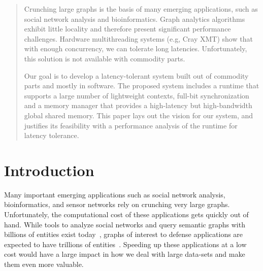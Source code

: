 \documentclass[10pt,nocopyrightspace]{sigplanconf}
\begin{document}
\thispagestyle{empty}
\pagestyle{empty}


\begin{abstract}
   Crunching large graphs is the basis of many emerging applications,
   such as social network analysis and bioinformatics. Graph analytics
   algorithms exhibit little locality and therefore present significant
   performance challenges. Hardware multithreading systems (e.g, Cray
   XMT) show that with enough concurrency, we can tolerate long
   latencies. Unfortunately, this solution is not available with
   commodity parts.
 
   Our goal is to develop a latency-tolerant system built out of
   commodity parts and mostly in software. The proposed system includes
   a runtime that supports a large number of lightweight contexts,
   full-bit synchronization and a memory manager that provides a
   high-latency but high-bandwidth global shared memory. This paper
   lays out the vision for our system, and justifies its feasibility
   with a performance analysis of the runtime for latency tolerance.
 
\end{abstract}

\section{Introduction}

Many important emerging applications such as social network analysis,
bioinformatics, and sensor networks rely on crunching very large
graphs. Unfortunately, the computational cost of these applications
gets quickly out of hand. While tools to analyze social networks and
query semantic graphs with billions of entities exist
today~\cite{joslyn:hpsf, ediger:msda, brocheler:cosi, pegasus,
  pregel}, graphs of interest to defense applications are expected to
have trillions of entities~\cite{hartley:mssg, kolda:imkd}. Speeding
up these applications at a low cost would have a large impact in how
we deal with large data-sets and make them even more valuable.



\end{document}
